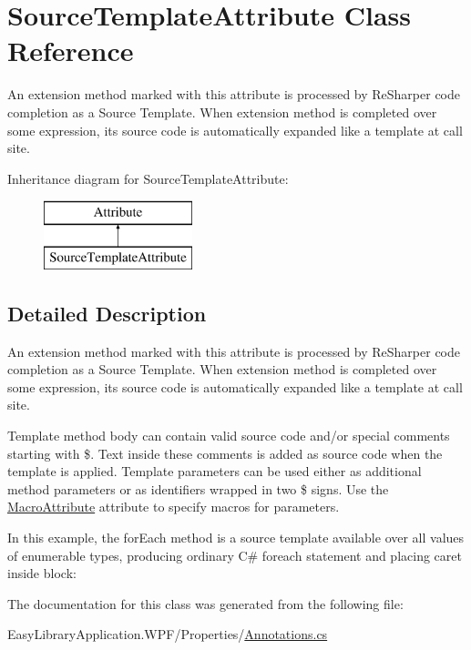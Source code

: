 \hypertarget{class_source_template_attribute}{}\section{Source\+Template\+Attribute Class Reference}
\label{class_source_template_attribute}


An extension method marked with this attribute is processed by Re\+Sharper code completion as a \textquotesingle{}Source Template\textquotesingle{}. When extension method is completed over some expression, it\textquotesingle{}s source code is automatically expanded like a template at call site.  


Inheritance diagram for Source\+Template\+Attribute\+:\begin{figure}[H]
\begin{center}
\leavevmode
\includegraphics[height=2.000000cm]{class_source_template_attribute}
\end{center}
\end{figure}


\subsection{Detailed Description}
An extension method marked with this attribute is processed by Re\+Sharper code completion as a \textquotesingle{}Source Template\textquotesingle{}. When extension method is completed over some expression, it\textquotesingle{}s source code is automatically expanded like a template at call site. 

Template method body can contain valid source code and/or special comments starting with \textquotesingle{}\$\textquotesingle{}. Text inside these comments is added as source code when the template is applied. Template parameters can be used either as additional method parameters or as identifiers wrapped in two \textquotesingle{}\$\textquotesingle{} signs. Use the \mbox{\hyperlink{class_macro_attribute}{Macro\+Attribute}} attribute to specify macros for parameters. 

In this example, the \textquotesingle{}for\+Each\textquotesingle{} method is a source template available over all values of enumerable types, producing ordinary C\# \textquotesingle{}foreach\textquotesingle{} statement and placing caret inside block\+: 
 

The documentation for this class was generated from the following file\+:\begin{DoxyCompactItemize}
\item 
Easy\+Library\+Application.\+W\+P\+F/\+Properties/\mbox{\hyperlink{_annotations_8cs}{Annotations.\+cs}}\end{DoxyCompactItemize}
